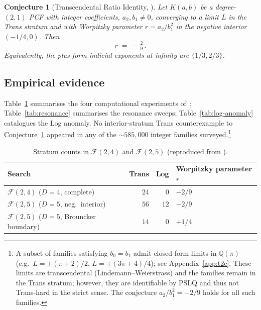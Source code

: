 \documentclass[11pt]{amsart}
\newtheorem{conjecture}[theorem]{Conjecture}
\theoremstyle{definition}
\theoremstyle{remark}
\newcommand{\FF}{\mathcal{F}}
\begin{document}
\begin{conjecture}[Transcendental Ratio Identity, \cite{TRINote}]
\label{conj:tri}
Let $K(a,b)$ be a degree-$(2,1)$ PCF with integer coefficients,
$a_2,b_1 \ne 0$, converging to a limit $L$ in the Trans stratum and
with Worpitzky parameter $r = a_2/b_1^2$ in the negative interior
$(-1/4,0)$.  Then
\[
  r \;=\; -\tfrac{2}{9}\,.
\]
Equivalently, the plus-form indicial exponents at infinity are
$\{1/3,2/3\}$.
\end{conjecture}

\subsection{Empirical evidence}\label{sec:evidence}

Table~\ref{tab:censuses} summarises the four computational
experiments of~\cite{TRINote}; Table~\ref{tab:resonance} summarises
the resonance sweeps; Table~\ref{tab:log-anomaly} catalogues the Log
anomaly.  No interior-stratum Trans counterexample to
Conjecture~\ref{conj:tri} appeared in any of the
$\sim\!585{,}000$ integer families surveyed.\footnote{A subset of
families satisfying $b_0 = b_1$ admit closed-form limits in
$\mathbb{Q}(\pi)$ (e.g.\ $L = \pm(\pi+2)/2$, $L = \pm(3\pi+4)/4$);
see Appendix~\ref{app:t2c}.  These limits are transcendental
(Lindemann--Weierstrass) and the families remain in the Trans
stratum; however, they are identifiable by PSLQ and thus not
Trans-hard in the strict sense.  The conjecture
$a_2/b_1^2 = -2/9$ holds for all such families.}

\begin{table}[t]
\centering
\caption{Stratum counts in $\FF(2,4)$ and $\FF(2,5)$
(reproduced from \cite{TRINote}).}
\label{tab:censuses}
\begin{tabular}{lrrl}
\toprule
Search & Trans & Log & Worpitzky parameter $r$ \\
\midrule
$\FF(2,4)$ ($D=4$, complete)
  & $24$ & $0$  & $-2/9$ \\
$\FF(2,5)$ ($D=5$, neg.\ interior)
  & $56$ & $12$ & $-2/9$ \\
$\FF(2,5)$ ($D=5$, Brouncker boundary)
  & $14$ & $0$  & $+1/4$ \\
\bottomrule
\end{tabular}
\end{table}
\end{document}
